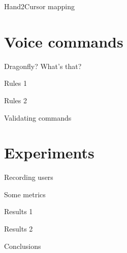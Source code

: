 \documentclass[english]{beamer}
\begin{document}
\begin{frame}{Hand2Cursor mapping}
\end{frame}

\section{Voice commands}
\begin{frame}{Dragonfly? What's that?}
\end{frame}

\begin{frame}{Rules 1}
\end{frame}

\begin{frame}{Rules 2}
\end{frame}

\begin{frame}{Validating commands}
\end{frame}

\section{Experiments}
\begin{frame}{Recording users}
\end{frame}

\begin{frame}{Some metrics}
\end{frame}

\begin{frame}{Results 1}
\end{frame}

\begin{frame}{Results 2}
\end{frame}


\begin{frame}{Conclusions}
\end{frame}
\end{document}
